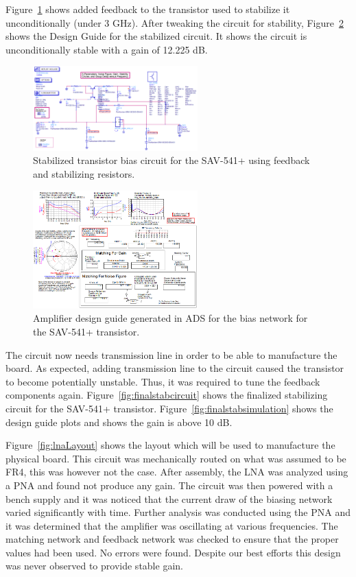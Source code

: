 \documentclass[conference]{IEEEtran}
\begin{document}
Figure~\ref{fig:designcuidecircuitstabilized} shows added feedback to the transistor used to stabilize it unconditionally (under 3 GHz). After tweaking the circuit for stability, Figure~\ref{fig:designcuidesimulationstabilized} shows the Design Guide for the stabilized circuit. It shows the circuit is unconditionally stable with a gain of 12.225 dB.

\begin{figure}[!h]
\centering
\includegraphics[width=2.5in]{pics/DesignGuideStablizedCircuit.png}
\caption{Stabilized transistor bias circuit for the SAV-541+ using feedback and stabilizing resistors.}
\label{fig:designcuidecircuitstabilized}
\end{figure}

\begin{figure}[!h]
\centering
\includegraphics[width=2.5in]{pics/DesignGuideStablizedSimulation.png}
\caption{Amplifier design guide generated in ADS for the bias network for the SAV-541+ transistor.}
\label{fig:designcuidesimulationstabilized}
\end{figure}

The circuit now needs transmission line in order to be able to manufacture the board. As expected, adding transmission line to the circuit caused the transistor to become potentially unstable. Thus, it was required to tune the feedback components again. Figure~\ref{fig:finalstabcircuit} shows the finalized stabilizing circuit for the SAV-541+ transistor. Figure~\ref{fig:finalstabsimulation} shows the design guide plots and shows the gain is above 10 dB.

Figure~\ref{fig:lnaLayout} shows the layout which will be used to manufacture the physical board.  This circuit was mechanically routed on what was assumed to be FR4, this was however not the case. After assembly, the LNA was analyzed using a PNA and found not produce any gain. The circuit was then powered with a bench supply and it was noticed that the current draw of the biasing network varied significantly with time. Further analysis was conducted using the PNA and it was determined that the amplifier was oscillating at various frequencies. The matching network and feedback network was checked to ensure that the proper values had been used. No errors were found. Despite our best efforts this design was never observed to provide stable gain.
\end{document}
